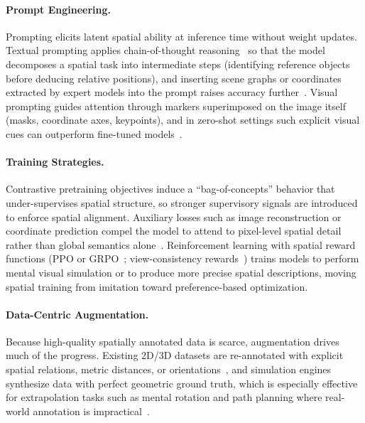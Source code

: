 \paragraph{Prompt Engineering.}
Prompting elicits latent spatial ability at inference time without weight updates.
Textual prompting applies chain-of-thought reasoning~\cite{liao2024reasoning} so that the model decomposes a spatial task into intermediate steps (identifying reference objects before deducing relative positions), and inserting scene graphs or coordinates extracted by expert models into the prompt raises accuracy further~\cite{mitra2024compositional}.
Visual prompting guides attention through markers superimposed on the image itself (masks, coordinate axes, keypoints), and in zero-shot settings such explicit visual cues can outperform fine-tuned models~\cite{yang2023set,liu20253daxisprompt}.

\paragraph{Training Strategies.}
Contrastive pretraining objectives induce a ``bag-of-concepts'' behavior that under-supervises spatial structure, so stronger supervisory signals are introduced to enforce spatial alignment.
Auxiliary losses such as image reconstruction or coordinate prediction compel the model to attend to pixel-level spatial detail rather than global semantics alone~\cite{wang2024reconstructive}.
Reinforcement learning with spatial reward functions (PPO or GRPO~\cite{wu2025reinforcing,shen2025fine}; view-consistency rewards~\cite{wang2025svqa}) trains models to perform mental visual simulation or to produce more precise spatial descriptions, moving spatial training from imitation toward preference-based optimization.

\paragraph{Data-Centric Augmentation.}
Because high-quality spatially annotated data is scarce, augmentation drives much of the progress.
Existing 2D/3D datasets are re-annotated with explicit spatial relations, metric distances, or orientations~\cite{wang2024all}, and simulation engines synthesize data with perfect geometric ground truth, which is especially effective for extrapolation tasks such as mental rotation and path planning where real-world annotation is impractical~\cite{tang2024sparkle,jiang2022pseudo}.

